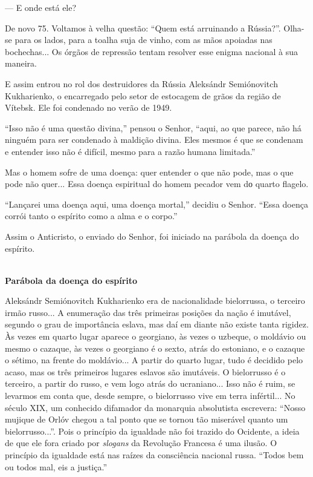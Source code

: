--- E onde está ele?

De novo 75. Voltamos à velha questão: ``Quem está arruinando a
Rússia?''. Olha-se para os lados, para a toalha suja de vinho, com as
mãos apoiadas nas bochechas... Os órgãos de repressão tentam resolver
esse enigma nacional à sua maneira.

E assim entrou no rol dos destruidores da Rússia Aleksándr Semiónovitch
Kukharienko, o encarregado pelo setor de estocagem de grãos da região de
Vítebsk. Ele foi condenado no verão de 1949.

``Isso não é uma questão divina,'' pensou o Senhor, ``aqui, ao que
parece, não há ninguém para ser condenado à maldição divina. Eles mesmos
é que se condenam e entender isso não é difícil, mesmo para a razão
humana limitada.''

Mas o homem sofre de uma doença: quer entender o que não pode, mas o que
pode não quer... Essa doença espiritual do homem pecador vem dо quarto
flagelo.

``Lançarei uma doença aqui, uma doença mortal,'' decidiu o Senhor.
``Essa doença corrói tanto o espírito como a alma e o corpo.''

Assim o Anticristo, o enviado do Senhor, foi iniciado na parábola da
doença do espírito.

\textbf{\\
Parábola da doença do espírito}

Aleksándr Semiónovitch Kukharienko era de nacionalidade bielorrussa, o
terceiro irmão russo... A enumeração das três primeiras posições da
nação é imutável, segundo o grau de importância eslava, mas daí em
diante não existe tanta rigidez. Às vezes em quarto lugar aparece o
georgiano, às vezes o uzbeque, o moldávio ou mesmo o cazaque, às vezes o
georgiano é o sexto, atrás do estoniano, e o cazaque o sétimo, na frente
do moldávio... A partir do quarto lugar, tudo é decidido pelo acaso, mas
os três primeiros lugares eslavos são imutáveis. O bielorrusso é o
terceiro, a partir do russo, e vem logo atrás do ucraniano... Isso não é
ruim, se levarmos em conta que, desde sempre, o bielorrusso vive em
terra infértil... No século XIX, um conhecido difamador da monarquia
absolutista escrevera: ``Nosso mujique de Orlóv chegou a tal ponto que
se tornou tão miserável quanto um bielorrusso...''. Pois o princípio da
igualdade não foi trazido do Ocidente, a ideia de que ele fora criado
por \emph{slogans} da Revolução Francesa é uma ilusão. O princípio da
igualdade está nas raízes da consciência nacional russa. ``Todos bem ou
todos mal, eis a justiça.''

